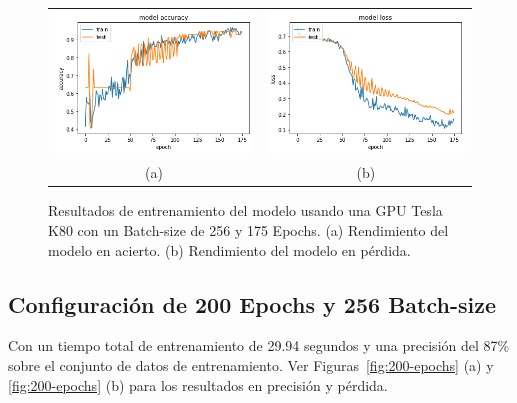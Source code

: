     \begin{figure}[H]
    \centering
    \begin{tabular}{cc}
        \includegraphics[height=0.35\textwidth]{images/chapter5/batch_256_175_epoch.png} &
        \includegraphics[height=0.35\textwidth]{images/chapter5/batch_256_175_epoch_loss.png}\\
        (a) & (b)\\
    \end{tabular}
    \caption{Resultados de entrenamiento del modelo usando una GPU Tesla K80 con un Batch-size de 256 y 175 Epochs. (a) Rendimiento del modelo en acierto. (b) Rendimiento del modelo en pérdida.}    \label{fig:175-epochs}
\end{figure}

\subsection{Configuración de 200 Epochs y 256 Batch-size}

 Con un tiempo total de entrenamiento de 29.94 segundos y una precisión del 87\% sobre el conjunto de datos de entrenamiento.
    Ver Figuras~\ref{fig:200-epochs} (a) y \ref{fig:200-epochs} (b) para los resultados en precisión y pérdida.




